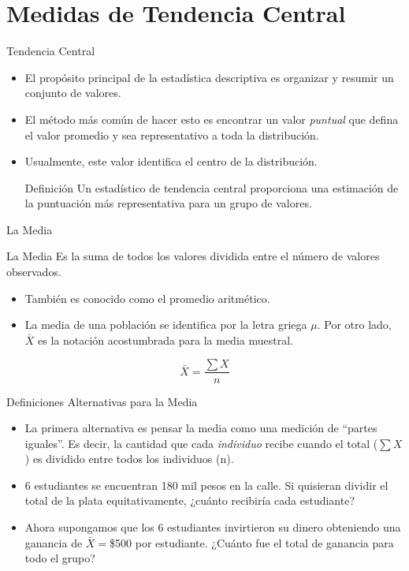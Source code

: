 \documentclass[xcolor=dvipsnames]{beamer}
\begin{document}
\section{Medidas de Tendencia Central}
\begin{frame}{Tendencia Central}
	\begin{itemize}
		\justifying 
		\item El propósito principal de la estadística descriptiva es organizar y resumir un conjunto de valores.
		\item El método más común de hacer esto es encontrar un valor \emph{puntual} que defina el valor promedio y sea representativo a toda la distribución. 
		\item Usualmente, este valor identifica el centro de la distribución. 
		\begin{block}{Definición}
			Un estadístico de tendencia central proporciona una estimación de la puntuación más representativa para un grupo de valores. 
		\end{block}
	\end{itemize}
	
\end{frame}

\begin{frame}{La Media}
	\begin{block}{La Media}
		Es la suma de todos los valores dividida entre el número de valores observados.
	\end{block}
	\begin{itemize}
		\justifying
		\item También es conocido como el promedio aritmético.
		\item La media de una población se identifica por la letra griega $\mu$. Por otro lado,  $\bar{X}$ es la notación acostumbrada para la media muestral. 
	\end{itemize}
	
	$$ \bar{X}=\dfrac{\sum{X}}{n} $$
\end{frame}

\begin{frame}{Definiciones Alternativas para la Media}
	\begin{itemize}
		\justifying
		\item La primera alternativa es pensar la media como una medición de ``partes iguales''. Es decir, la cantidad que cada \emph{individuo} recibe cuando el total ($\sum{X}$) es dividido entre todos los individuos (n).
		\item 6 estudiantes se encuentran 180 mil pesos en la calle. Si quisieran dividir el total de la plata equitativamente, ¿cuánto recibiría cada estudiante?
		\item Ahora supongamos que los 6 estudiantes invirtieron su dinero obteniendo una ganancia de $\bar{X}=$\$500 por estudiante. ¿Cuánto fue el total de ganancia para todo el grupo?
	\end{itemize}
\end{frame}
\end{document}
